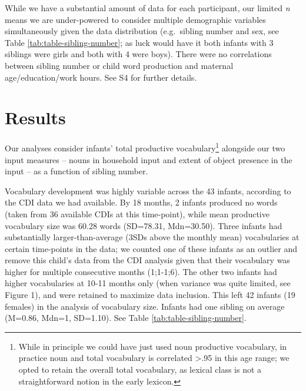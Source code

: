 \documentclass[
  man,mask,floatsintext]{apa6}
\begin{document}
While we have a substantial amount of data for each participant, our limited \emph{n} means we are under-powered to consider multiple demographic variables simultaneously given the data distribution (e.g.~sibling number and sex, see Table \ref{tab:table-sibling-number}; as luck would have it both infants with 3 siblings were girls and both with 4 were boys). There were no correlations between sibling number or child word production and maternal age/education/work hours. See S4 for further details.

\hypertarget{results}{%
\section{Results}\label{results}}

Our analyses consider infants' total productive vocabulary\footnote{While in principle we could have just used noun productive vocabulary, in practice noun and total vocabulary is correlated \textgreater.95 in this age range; we opted to retain the overall total vocabulary, as lexical class is not a straightforward notion in the early lexicon.} alongside our two input measures -- nouns in household input and extent of object presence in the input -- as a function of sibling number.

Vocabulary development was highly variable across the 43 infants, according to the CDI data we had available. By 18 months, 2 infants produced no words (taken from 36 available CDIs at this time-point), while mean productive vocabulary size was 60.28 words (SD=78.31, Mdn=30.50). Three infants had substantially larger-than-average (3SDs above the monthly mean) vocabularies at certain time-points in the data; we counted one of these infants as an outlier and remove this child's data from the CDI analysis given that their vocabulary was higher for multiple consecutive months (1;1-1;6). The other two infants had higher vocabularies at 10-11 months only (when variance was quite limited, see Figure 1), and were retained to maximize data inclusion. This left 42 infants (19 females) in the analysis of vocabulary size. Infants had one sibling on average (M=0.86, Mdn=1, SD=1.10). See Table \ref{tab:table-sibling-number}.
\end{document}
